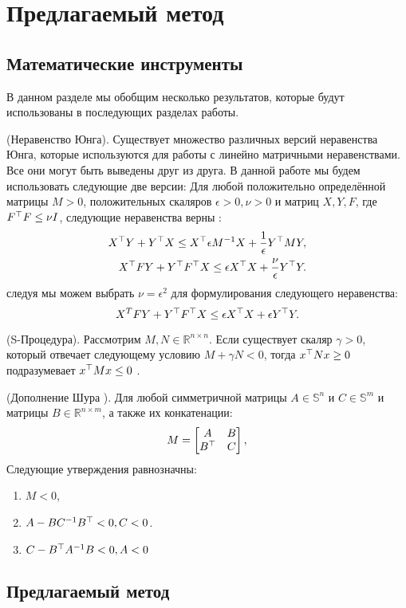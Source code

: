 \chapter{Предлагаемый метод}\label{ch:ch3}

\section{Математические инструменты}\label{sec:ch3/sect1}
В данном разделе мы обобщим несколько результатов, которые будут использованы в последующих разделах работы.
\begin{lemma}\label{lemma:Young}
	(Неравенство Юнга).
	Существует множество различных версий неравенства Юнга, которые используются для работы с линейно матричными неравенствами. Все они могут быть выведены друг из друга. В данной работе мы будем использовать следующие две версии:
	Для любой положительно определённой матрицы $M>0$, положительных скаляров $\epsilon > 0, \nu > 0$ и матриц ${X}, {Y}, {F}$, где ${F}^\top{F}\leq \nu{I}$, следующие неравенства верны \cite{BOYED1994}:
	\begin{align}
		\label{eq:Young_relation_BMI}
		{X}^\top{Y} + {Y}^\top{X}  \leq {X}^\top 
		\epsilon {M}^{-1}{X} + \frac{1}{\epsilon}   {Y}^\top  {M}{Y}, 
		\\
		\label{eq:Young_robust_2}
		{X}^\top{F}{Y} + {Y}^\top{F}^\top{X}  \leq \epsilon {X}^\top{X} +  \frac{\nu}{\epsilon} {Y}^\top {Y}.
	\end{align}
	следуя \cite{LIEN2008} мы можем выбрать $\nu=\epsilon^2$ для формулирования следующего неравенства:
	\begin{equation}
		\label{eq:updated_Young_robust_2}
		{X}^T{F}{Y} + {Y}^\top{F}^\top{X}  \leq \epsilon {X}^\top{X} + \epsilon {Y}^\top{Y}.
	\end{equation}
\end{lemma}

\begin{lemma}\label{lemma:S_procedure}
	(S-Процедура).
	Рассмотрим ${M},{N} \in \mathbb{R}^{n\times n}$. Если существует скаляр $\gamma>0$, который отвечает следующему условию ${M}+\gamma {N}<0$, тогда $x^\top {N} x\geq 0$ подразумевает $x^\top{M}x\leq 0$ \cite{BOYED1994}.
\end{lemma}

\begin{lemma}\label{lemma:Schur}
	(Дополнение Шура \cite{Schur}).
	Для любой симметричной матрицы ${A}\in \mathbb{S}^n$ и ${C}\in \mathbb{S}^m$ и матрицы ${B}\in \mathbb{R}^{n\times m}$, а также их конкатенации:
	\noindent \begin{align*}
		{M}= \begin{bmatrix}
			{A} & {B} \\
			{B}^\top & {C} 
		\end{bmatrix},
	\end{align*}
	Следующие утверждения равнозначны:
	\noindent
	\begin{enumerate}
		\item ${M} < 0$,
		\item ${A}-{B}{C}^{-1}{B}^\top < 0 , {C}< 0$.
		\item ${C}-{B}^\top{A}^{-1}{B}< 0 , {A}< 0$
	\end{enumerate}
\end{lemma}

\section{Предлагаемый метод}\label{sec:ch3/sect2}
\clearpage
